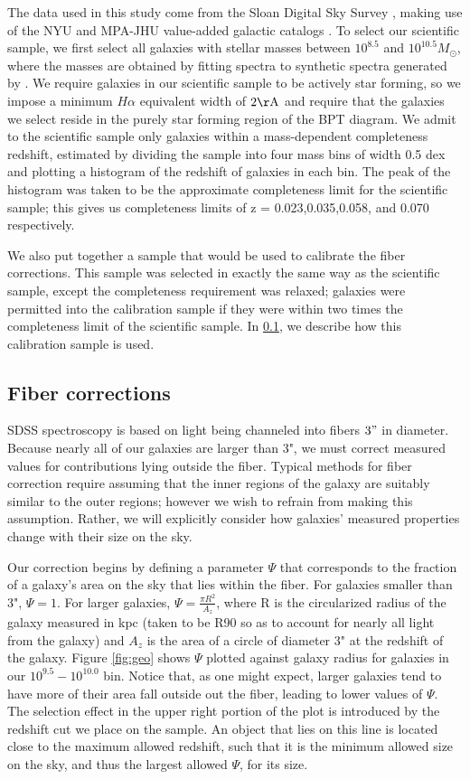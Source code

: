\documentclass[iop]{emulateapj}
\begin{document}
The data used in this study come from the Sloan Digital Sky Survey \citep[SDSS,][]{SDSS}, making use of the NYU and MPA-JHU value-added galactic catalogs \citep{Kauffmann03,Brinchmann04,blanton05vagc}. To select our scientific sample, we first select all galaxies with stellar masses between $10^{8.5}$ and $10^{10.5} M_{\odot}$, where the masses are obtained by fitting spectra to synthetic spectra generated by \cite{BC03}. We require galaxies in our scientific sample to be actively star forming, so we impose a minimum $H\alpha$ equivalent width of $2 \rm \AA$ and require that the galaxies we select reside in the purely star forming region of the BPT diagram. We admit to the scientific sample only galaxies within a mass-dependent completeness redshift, estimated by dividing the sample into four mass bins of width 0.5 dex and plotting a histogram of the redshift of galaxies in each bin. The peak of the histogram was taken to be the approximate completeness limit for the scientific sample; this gives us completeness limits of z = 0.023,0.035,0.058, and 0.070 respectively.

We also put together a sample that would be used to calibrate the fiber corrections. This sample was selected in exactly the same way as the scientific sample, except the completeness requirement was relaxed; galaxies were permitted into the calibration sample if they were within two times the completeness limit of the scientific sample. In \ref{sec:fibercor}, we describe how this calibration sample is used.

\subsection{Fiber corrections}
\label{sec:fibercor}
SDSS spectroscopy is based on light being channeled into fibers $3"$ in diameter. Because nearly all of our galaxies are larger than 3", we must correct measured values for contributions lying outside the fiber. Typical methods for fiber correction require assuming that the inner regions of the galaxy are suitably similar to the outer regions; however we wish to refrain from making this assumption. Rather, we will explicitly consider how galaxies' measured properties change with their size on the sky.

Our correction begins by defining a parameter $\Psi$ that corresponds to the fraction of a galaxy's area on the sky that lies within the fiber. For galaxies smaller than 3", $\Psi = 1$. For larger galaxies, $\Psi = \frac{\pi R^2}{A_z}$, where R is the circularized radius of the galaxy measured in kpc (taken to be R90 so as to account for nearly all light from the galaxy) and $A_z$ is the area of a circle of diameter 3" at the redshift of the galaxy. Figure \ref{fig:geo} shows $\Psi$ plotted against galaxy radius for galaxies in our $10^{9.5}-10^{10.0}$ bin. Notice that, as one might expect, larger galaxies tend to have more of their area fall outside out the fiber, leading to lower values of $\Psi$. The selection effect in the upper right portion of the plot is introduced by the redshift cut we place on the sample. An object that lies on this line is located close to the maximum allowed redshift, such that it is the minimum allowed size on the sky, and thus the largest allowed $\Psi$, for its size. 
\end{document}
